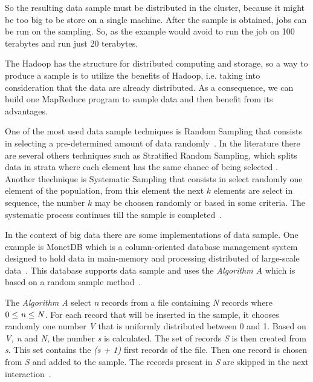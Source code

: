 So the resulting data sample must be distributed in the cluster, because it might
be too big to be store on a single machine. After the sample is obtained, jobs
can be run on the sampling. So, as the example would avoid to run the job on 100
terabytes and run just 20 terabytes.


The Hadoop has the structure for distributed computing and storage, so a way to 
produce a sample is to utilize the benefits of Hadoop, i.e. taking into consideration
that the data are already distributed. As a consequence, we can build one MapReduce
program to sample data and then benefit from its advantages.

One of the most used data sample techniques is Random Sampling that consists
in selecting a pre-determined amount of data randomly~\cite{randomsampling}.
In the literature there are several others techniques such as Stratified Random Sampling,
which splits data in strata where each element has the same chance of being selected
\cite{de1986sampling}. Another thechnique is Systematic Sampling that consists
in select randomly one element of the population, from this element the next $k$
elements are select in sequence, the number $k$ may be choosen randomly or based
in some criteria. The systematic process continues till the sample is completed~\cite{systematicsampling}.


In the context of big data there are some implementations of data sample. One example
is MonetDB which is a column-oriented database management system designed to hold
data in main-memory and processing distributed of large-scale data~\cite{monetDB}.
This database supports data sample and uses the {\it Algorithm A} which is based on
a random sample method~\cite{monetDB:sampling}.

The {\it Algorithm A} select {\it n} records from a file containing {\it N} records where
$0\le{\it n}\le{\it N}$. For each record that will be inserted in the sample,
it chooses randomly one number {\it V} that is uniformly distributed between 0 and 1.
Based on {\it V, n} and {\it N}, the number {\it s} is calculated. The set of records
{\it S} is then created from {\it s}. This set contains the {\it (s + 1)} first
records of the file. Then one record is chosen from {\it S} and added to the sample.
The records present in {\it S} are skipped in the next interaction~\cite{vitter:1984}.

